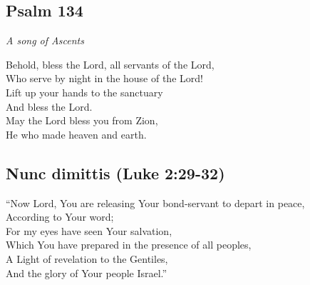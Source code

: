 \documentclass[14pt]{extbook}
\begin{document}
\hypertarget{psalm-134}{%
\subsection{Psalm 134}\label{psalm-134}}

\emph{A song of Ascents}

Behold, bless the Lord, all servants of the Lord,\\
Who serve by night in the house of the Lord!\\
Lift up your hands to the sanctuary\\
And bless the Lord.\\
May the Lord bless you from Zion,\\
He who made heaven and earth.

\hypertarget{nunc-dimittis-luke-229-32}{%
\subsection{Nunc dimittis (Luke
2:29-32)}\label{nunc-dimittis-luke-229-32}}

``Now Lord, You are releasing Your bond-servant to depart in peace,\\
According to Your word;\\
For my eyes have seen Your salvation,\\
Which You have prepared in the presence of all peoples,\\
A Light of revelation to the Gentiles,\\
And the glory of Your people Israel.''

\newpage 
\thispagestyle{empty}
\
\end{document}
